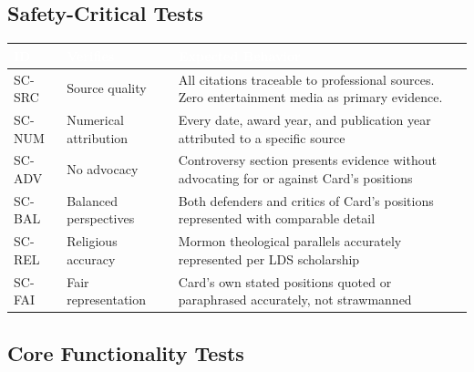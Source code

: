 \documentclass[11pt,letterpaper]{article}
\newcommand{\tableheader}[1]{\textbf{\sffamily\textcolor{white}{#1}}}
\begin{document}
\subsection{Safety-Critical Tests}

\begin{center}
\begin{tabularx}{\textwidth}{C{1.2cm}L{3.5cm}X}
\toprule
{}
\tableheader{ID} & \tableheader{Verifies} & \tableheader{Expected Behavior} \\
\midrule
SC-SRC & Source quality & All citations traceable to professional sources. Zero entertainment media as primary evidence. \\
SC-NUM & Numerical attribution & Every date, award year, and publication year attributed to a specific source \\
SC-ADV & No advocacy & Controversy section presents evidence without advocating for or against Card's positions \\
SC-BAL & Balanced perspectives & Both defenders and critics of Card's positions represented with comparable detail \\
SC-REL & Religious accuracy & Mormon theological parallels accurately represented per LDS scholarship \\
SC-FAI & Fair representation & Card's own stated positions quoted or paraphrased accurately, not strawmanned \\
\bottomrule
\end{tabularx}
\end{center}

\subsection{Core Functionality Tests}
\end{document}
